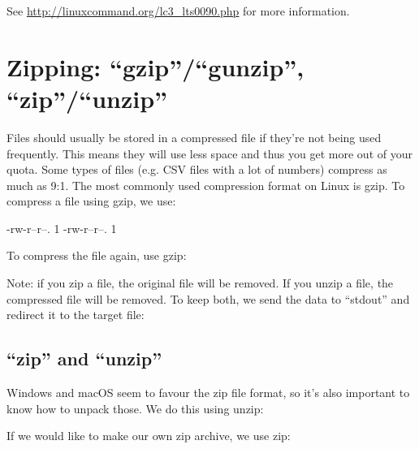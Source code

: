 See \url{http://linuxcommand.org/lc3_lts0090.php} for more information.

\section{Zipping: ``gzip''/``gunzip'', ``zip''/``unzip''}

Files should usually be stored in a compressed file if they're not being used
frequently. This means they will use less space and thus you get more out of
your quota. Some types of files (e.g. CSV files with a lot of numbers) compress
as much as 9:1. The most commonly used compression format on Linux is gzip. To
compress a file using gzip, we use:

\begin{prompt}
    -rw-r--r--. 1 %
    -rw-r--r--. 1 %
\end{prompt}


To compress the file again, use gzip:

\begin{prompt}
\end{prompt}

Note: if you zip a file, the original file will be removed. If you unzip a file,
the compressed file will be removed. To keep both, we send the data to
``stdout'' and redirect it to the target file:

\begin{prompt}
\end{prompt}

\subsection{``zip'' and ``unzip''}

Windows and macOS seem to favour the zip file format, so it's also important to
know how to unpack those. We do this using unzip:

\begin{prompt}
\end{prompt}

If we would like to make our own zip archive, we use zip:

\begin{prompt}
\end{prompt}

